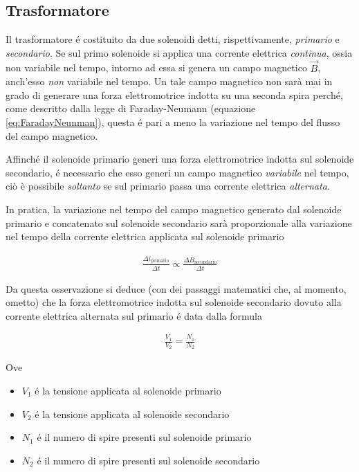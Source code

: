 \documentclass[17pt]{extarticle}
\begin{document}
\begin{enumerate}
\section{Trasformatore}

Il trasformatore \'e costituito da due solenoidi detti, rispettivamente, \emph{primario} e \emph{secondario}. Se sul primo solenoide si applica una corrente elettrica \emph{continua}, ossia non variabile nel tempo, intorno ad essa si genera un campo magnetico $\vec{B}$, anch'esso \emph{non} variabile nel tempo. Un tale campo magnetico non sarà mai in grado di generare una forza elettromotrice indotta su una seconda spira perch\'e, come descritto dalla legge di Faraday-Neumann (equazione \ref{eq:FaradayNeunman}), questa \'e pari a meno la variazione nel tempo del flusso del campo magnetico.

Affinch\'e il solenoide primario generi una forza elettromotrice indotta sul solenoide secondario, \'e necessario che esso generi un campo magnetico \emph{variabile} nel tempo, ciò è possibile \emph{soltanto} se sul primario passa una corrente elettrica \emph{alternata}. 

In pratica, la variazione nel tempo del campo magnetico generato dal solenoide primario e concatenato sul solenoide secondario sarà proporzionale alla variazione nel tempo della corrente elettrica applicata sul solenoide primario

\begin{eqnarray}
	\frac{\Delta i_{\textrm{primario} } }{\Delta t}\propto \frac{\Delta B_{\textrm{secondario}}}{\Delta t}
\end{eqnarray}

Da questa osservazione si deduce (con dei passaggi matematici che, al momento, ometto) che la forza elettromotrice indotta sul solenoide secondario dovuto alla corrente elettrica alternata sul primario \'e data dalla formula

\begin{eqnarray}
	\frac{V_1}{V_2} = \frac{N_1}{N_2}
\end{eqnarray}

Ove




\begin{itemize}
	\item $V_1$ \'e la tensione applicata al solenoide primario
	\item $V_2$ \'e la tensione applicata al solenoide secondario
	\item $N_1$ \'e il numero di spire presenti sul solenoide primario
	\item $N_2$ \'e il numero di spire presenti sul solenoide secondario
\end{itemize}
\end{enumerate}
	
\end{document}
